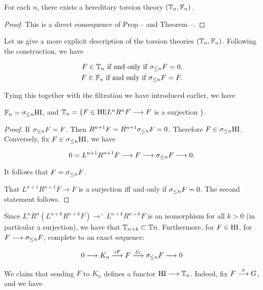 \begin{cor}
For each $n$, there exists a hereditary torsion theory $(\mathbb{T}_n, \mathbb{F}_n)$.
\end{cor}

\begin{proof}
This is a direct consequence of Prop -- and Theorem --.
\end{proof}

Let us give a more explicit description of the torsion theories $(\mathbb{T}_n, \mathbb{F}_n)$.
Following the construction, we have

\begin{align*}\label{f0}
F \in \mathbb{T}_n \textrm{ if and only if } \sigma_{\leq n} F = 0. \\
F \in \mathbb{F}_n \textrm{ if and only if } \sigma_{\leq n} F = F.
\end{align*}

Tying this together with the filtration we have introduced earlier, we have

\begin{prop}
$\mathbb{F}_n = \sigma_{\leq n} \mathrm{HI}$, and $\mathbb{T}_n = \{F \in \mathrm{HI} | L^nR^nF \longrightarrow F$ is a surjection $\}$.
\end{prop}

\begin{proof}
If $\sigma_{\leq n}F = F$. Then $R^{n+1}F=R^{n+1}\sigma_{\leq n}F=0$. Therefore $F \in \sigma_{\leq n} \mathrm{HI}$. Conversely, fix
$F \in \sigma_{\leq n} \mathrm{HI}$, we have

\begin{equation}
0 = L^{n+1}R^{n+1}F \longrightarrow F \longrightarrow \sigma_{\leq n}F \longrightarrow 0.
\end{equation}

It follows that $F= \sigma_{\leq n}F$.

That $L^{n+1}R^{n+1}F \longrightarrow F$ is a surjection iff and only if $\sigma_{\leq n}F = 0$. The second statement
follows.
\end{proof}

Since $L^nR^n(L^{n+k}R^{n+k}F) \longrightarrow^{\sim} L^{n+k}R^{n+k} F$ is an isomorphism for all $k > 0$
(in particular a surjection), we have that $\mathbb{T}_{n+k} \subset \mathbb{T}{n}$. Furthermore, for $F \in \mathrm{HI}$, for
$F \longrightarrow \sigma_{\leq n} F$, complete to an exact sequence:

\begin{equation}
0 \longrightarrow K_n \stackrel{iF}{\longrightarrow} F \stackrel{S_I}{\longrightarrow} \sigma_{\leq n}F \longrightarrow 0
\end{equation}

We claim that sending $F$ to $K_n$ defines a functor $\mathrm{HI} \longrightarrow \mathbb{T}_n$. Indeed, fix 
$F \stackrel{\phi}{\longrightarrow} G$, and we have

